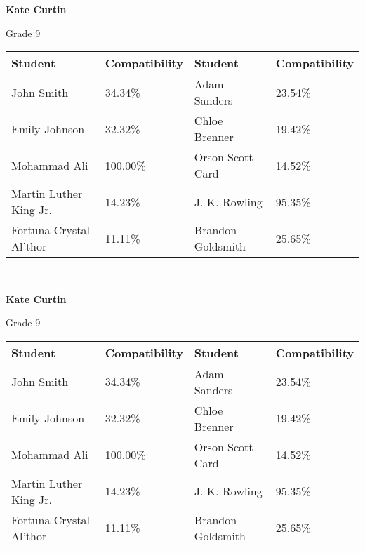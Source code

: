 \documentclass[11pt]{article}
\begin{document}
    \begin{minipage}[b][0.19\textheight][t]{\textwidth}

        \textbf{Kate Curtin}

        Grade 9

        \bigskip

        \begin{tabularx}{\textwidth}{|| Y | Y || Y | Y ||}
            Student & Compatibility & Student & Compatibility \\
            \hline
            John Smith & 34.34\% & Adam Sanders & 23.54\% \\
            Emily Johnson & 32.32\% & Chloe Brenner & 19.42\%  \\
            Mohammad Ali & 100.00\% & Orson Scott Card & 14.52\%  \\
            Martin Luther King Jr. & 14.23\% & J. K. Rowling & 95.35\%  \\
            \raggedright Fortuna Crystal Al'thor & 11.11\% & Brandon Goldsmith & 25.65\%  \\
        \end{tabularx}

    \end{minipage} \\
    \begin{minipage}[b][0.19\textheight][t]{\textwidth}

        \textbf{Kate Curtin}

        Grade 9

        \bigskip

        \begin{tabularx}{\textwidth}{|| Y | Y || Y | Y ||}
            Student & Compatibility & Student & Compatibility \\
            \hline
            John Smith & 34.34\% & Adam Sanders & 23.54\% \\
            Emily Johnson & 32.32\% & Chloe Brenner & 19.42\%  \\
            Mohammad Ali & 100.00\% & Orson Scott Card & 14.52\%  \\
            Martin Luther King Jr. & 14.23\% & J. K. Rowling & 95.35\%  \\
            \raggedright Fortuna Crystal Al'thor & 11.11\% & Brandon Goldsmith & 25.65\%  \\
        \end{tabularx}

    \end{minipage} \\
\end{document}
